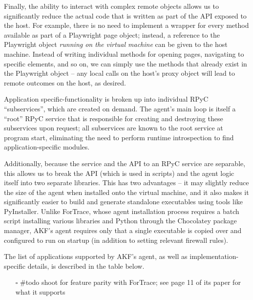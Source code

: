 \documentclass[letterpaper,12pt]{report}
\def\tightlist{}
\begin{document}
Finally, the ability to interact with complex remote objects allows us
to significantly reduce the actual code that is written as part of the
API exposed to the host. For example, there is no need to implement a
wrapper for every method available as part of a Playwright page object;
instead, a reference to the Playwright object \emph{running on the
virtual machine} can be given to the host machine. Instead of writing
individual methods for opening pages, navigating to specific elements,
and so on, we can simply use the methods that already exist in the
Playwright object -- any local calls on the host's proxy object will
lead to remote outcomes on the host, as desired.

Application specific-functionality is broken up into individual RPyC
``subservices'', which are created on demand. The agent's main loop is
itself a ``root'' RPyC service that is responsible for creating and
destroying these subservices upon request; all subservices are known to
the root service at program start, eliminating the need to perform
runtime introspection to find application-specific modules.

Additionally, because the service and the API to an RPyC service are
separable, this allows us to break the API (which is used in scripts)
and the agent logic itself into two separate libraries. This has two
advantages -- it may slightly reduce the size of the agent when
installed onto the virtual machine, and it also makes it significantly
easier to build and generate standalone executables using tools like
PyInstaller. Unlike ForTrace, whose agent installation process requires
a batch script installing various libraries and Python through the
Chocolatey package manager, AKF's agent requires only that a single
executable is copied over and configured to run on startup (in addition
to setting relevant firewall rules).

The list of applications supported by AKF's agent, as well as
implementation-specific details, is described in the table below.

\begin{itemize}
\tightlist
\item[$\square$]
  \#todo shoot for feature parity with ForTrace; see page 11 of its
  paper for what it supports
\end{itemize}
\end{document}

